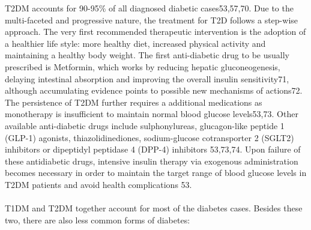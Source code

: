 T2DM accounts for 90-95\% of all diagnosed diabetic cases53,57,70. Due to the multi-faceted and progressive nature, the treatment for T2D follows a step-wise approach. The very first recommended therapeutic intervention is the adoption of a healthier life style: more healthy diet, increased physical activity and maintaining a healthy body weight. The first anti-diabetic drug to be usually prescribed is Metformin, which works by reducing hepatic gluconeogenesis, delaying intestinal absorption and improving the overall insulin sensitivity71, although accumulating evidence points to possible new mechanisms of actions72. The persistence of T2DM further requires a additional medications as monotherapy is insufficient to maintain normal blood glucose levels53,73. Other available anti-diabetic drugs include sulphonylureas, glucagon-like peptide 1 (GLP-1) agonists, thiazolidinediones, sodium-glucose cotransporter 2 (SGLT2) inhibitors or dipeptidyl peptidase 4 (DPP-4) inhibitors 53,73,74. Upon failure of these antidiabetic drugs, intensive insulin therapy via exogenous administration becomes necessary in order to maintain the target range of blood glucose levels in T2DM patients and avoid health complications 53.
\\\\
T1DM and T2DM together account for most of the diabetes cases. Besides these two, there are also less common forms of diabetes:






